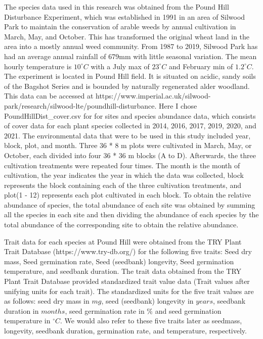\documentclass[a4paper, 11, margin=2cm]{article}
\begin{document}
    The species data used in this research was obtained from the Pound Hill Disturbance Experiment, which was established in 1991 in an area of Silwood Park to maintain the conservation of arable weeds by annual cultivation in March, May, and October. This has transformed the original wheat land in the area into a mostly annual weed community. From 1987 to 2019, Silwood Park has had an average annual rainfall of 679mm with little seasonal variation. The mean hourly temperature is $ 10^\circ C $ with a July max of $ 23^\circ C $ and February min of $ 1.2^\circ C $. The experiment is located in Pound Hill field. It is situated on acidic, sandy soils of the Bagshot Series and is bounded by naturally regenerated alder woodland. This data can be accessed at https://www.imperial.ac.uk/silwood-park/research/silwood-lte/poundhill-disturbance. Here I chose PoundHillDist\_cover.csv for for sites and species abundance data, which consists of cover data for each plant species collected in 2014, 2016, 2017, 2019, 2020, and 2021. The environmental data that were to be used in this study included year, block, plot, and month. Three 36 * 8 m plots were cultivated in March, May, or October, each divided into four 36 * 36 m blocks (A to D). Afterwards, the three cultivation treatments were repeated four times. The month is the month of cultivation, the year indicates the year in which the data was collected, block represents the block containing each of the three cultivation treatments, and plot(1 - 12) represents each plot cultivated in each block. To obtain the relative abundance of species, the total abundance of each site was obtained by summing all the species in each site and then dividing the abundance of each species by the total abundance of the corresponding site to obtain the relative abundance.

    Trait data for each species at Pound Hill were obtained from the TRY Plant Trait Database (https://www.try-db.org/) for the following five traits: Seed dry mass, Seed germination rate, Seed (seedbank) longevity, Seed germination temperature, and seedbank duration. The trait data obtained from the TRY Plant Trait Database provided standardized trait value data (Trait values after unifying units for each trait). The standardized units for the five trait values are as follows: seed dry mass in $mg$, seed (seedbank) longevity in $years$, seedbank duration in $months$, seed germination rate in $\%$ and seed germination temperature in $ ^\circ C $. We would also refer to these five traits later as seedmass, longevity, seedbank duration, germination rate, and temperature, respectively.
\end{document}
